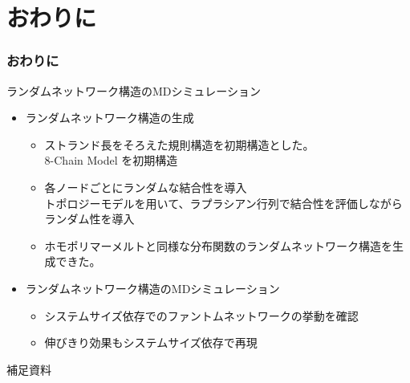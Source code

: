 \documentclass[11pt, dvipdfmx]{beamer}
\begin{document}
\section{おわりに}
\begin{frame}
\frametitle{おわりに}
\begin{block}{ランダムネットワーク構造のMDシミュレーション}
\begin{itemize}
\item
ランダムネットワーク構造の生成
	\begin{itemize}
	\item
	ストランド長をそろえた規則構造を初期構造とした。\\
	8-Chain Model を初期構造
	\item
	各ノードごとにランダムな結合性を導入\\
	トポロジーモデルを用いて、ラプラシアン行列で結合性を評価しながらランダム性を導入
	\item
	ホモポリマーメルトと同様な分布関数のランダムネットワーク構造を生成できた。
	\end{itemize}
\item
ランダムネットワーク構造のMDシミュレーション
	\begin{itemize}
	\item
	システムサイズ依存でのファントムネットワークの挙動を確認
	\item 
	伸びきり効果もシステムサイズ依存で再現
	\end{itemize}
\end{itemize}
\end{block}
\end{frame}
\appendix
\begin{frame}
\LARGE{補足資料}
\end{frame}
\end{document}
